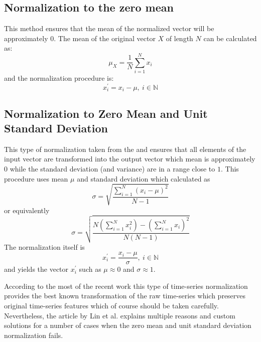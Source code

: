 \subsection{Normalization to the zero mean}
This method ensures that the mean of the normalized vector will be approximately $0$. The mean of the original vector $X$ of length $N$ can be calculated as:
\[
\mu_{X} = \frac{1}{N}\sum_{i=1}^{N}x_{i}
\]
and the normalization procedure is:
\[
x_{i}^{'} = x_{i} - \mu, \: i \in \mathbb{N}
\]


\subsection{Normalization to Zero Mean and Unit Standard Deviation}
This type of normalization taken from the \cite{citeulike:3815880} and ensures that all elements of the input vector are transformed into the output vector which mean is approximately $0$ while the standard deviation (and variance) are in a range close to $1$.
This procedure uses mean $\mu$ and standard deviation which calculated as 
\[
\sigma = \sqrt{ \frac{ \sum_{i=1}^{N} (x_{i} - \mu)^{2} }{ N - 1 } }
\]
or equivalently
\[
\sigma = \sqrt{ \frac{
                  N \left( \sum_{i=1}^{N} x_{i}^{2}  \right) - 
                  \left( \sum_{i=1}^{N} x_{i} \right) ^{2}
                }{
                  N(N-1)
                }  
          }
\]
The normalization itself is 
\begin{equation}
x_{i}^{'} = \frac{x_{i} - \mu}{\sigma}, \: i \in \mathbb{N}
\end{equation}
and yields the vector $x_{i}^{'}$ such as $\mu \approx 0$ and $\sigma \approx 1$.

According to the most of the recent work \cite{citeulike:3815880} \cite{citeulike:2821475} \cite{citeulike:3978002} this type of time-series normalization provides the best known transformation of the raw time-series which preserves original time-series features which of course should be taken carefully. Nevertheless, the article by Lin et al. \cite{citeulike:2821475} explains multiple reasons and custom solutions for a number of cases when the zero mean and unit standard deviation normalization fails.